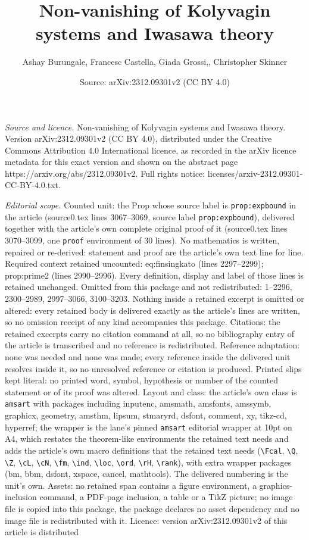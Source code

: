 \documentclass[10pt,a4paper]{amsart}
\title[Non-vanishing of Kolyvagin systems and Iwasawa theory]{Non-vanishing of Kolyvagin systems and Iwasawa theory}
\author{Ashay Burungale, Francesc Castella, Giada Grossi,, Christopher Skinner}
\date{Source: arXiv:2312.09301v2 (CC BY 4.0)}
\begin{document}
\maketitle

\noindent\emph{Source and licence.} Non-vanishing of Kolyvagin systems and Iwasawa theory. Version arXiv:2312.09301v2 (CC BY 4.0), distributed under the Creative Commons Attribution 4.0 International licence, as recorded in the arXiv licence metadata for this exact version and shown on the abstract page https://arxiv.org/abs/2312.09301v2. Full rights notice: licenses/arxiv-2312.09301-CC-BY-4.0.txt.\par\smallskip

\noindent\textit{Editorial scope.} Counted unit: the Prop whose source label is \texttt{prop:expbound} in the article (source0.tex lines 3067--3069, source label \texttt{prop:expbound}), delivered together with the article's own complete original proof of it (source0.tex lines 3070--3099, one \texttt{proof} environment of 30 lines). No mathematics is written, repaired or re-derived: statement and proof are the article's own text line for line. Required context retained uncounted: eq:finsingkato (lines 2297--2299); prop:prime2 (lines 2990--2996). Every definition, display and label of those lines is retained unchanged. Omitted from this package and not redistributed: 1--2296, 2300--2989, 2997--3066, 3100--3203. Nothing inside a retained excerpt is omitted or altered: every retained body is delivered exactly as the article's lines are written, so no omission receipt of any kind accompanies this package. Citations: the retained excerpts carry no citation command at all, so no bibliography entry of the article is transcribed and no reference is redistributed. Reference adaptation: none was needed and none was made; every reference inside the delivered unit resolves inside it, so no unresolved reference or citation is produced. Printed slips kept literal: no printed word, symbol, hypothesis or number of the counted statement or of its proof was altered. Layout and class: the article's own class is \texttt{amsart} with packages including inputenc, amsmath, amsfonts, amssymb, graphicx, geometry, amsthm, lipsum, stmaryrd, dsfont, comment, xy, tikz-cd, hyperref; the wrapper is the lane's pinned \texttt{amsart} editorial wrapper at 10pt on A4, which restates the theorem-like environments the retained text needs and adds the article's own macro definitions that the retained text needs (\texttt{\textbackslash Fcal}, \texttt{\textbackslash Q}, \texttt{\textbackslash Z}, \texttt{\textbackslash cL}, \texttt{\textbackslash cN}, \texttt{\textbackslash fm}, \texttt{\textbackslash ind}, \texttt{\textbackslash loc}, \texttt{\textbackslash ord}, \texttt{\textbackslash rH}, \texttt{\textbackslash rank}), with extra wrapper packages (bm, bbm, dsfont, xspace, cancel, mathtools). The delivered numbering is the unit's own. Assets: no retained span contains a figure environment, a graphics-inclusion command, a PDF-page inclusion, a table or a TikZ picture; no image file is copied into this package, the package declares no asset dependency and no image file is redistributed with it. Licence: version arXiv:2312.09301v2 of this article is distributed 
\end{document}
